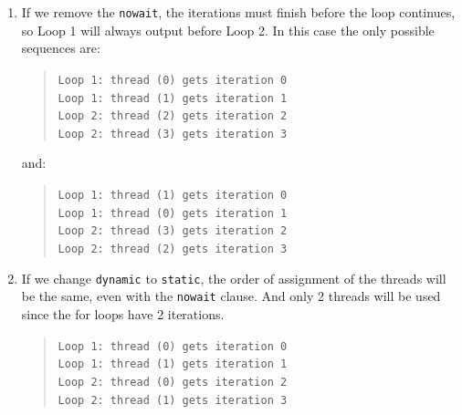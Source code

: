 \begin{enumerate}[label=\Alph*)]
\begin{enumerate}[label=\arabic*.]
\begin{quote}
{            Loop 1: thread (1) gets iteration 1 \\
            Loop 2: thread (3) gets iteration 2 \\
            Loop 2: thread (2) gets iteration 3}
        \end{quote}
        and:
        \begin{quote}
            \texttt{Loop 1: thread (0) gets iteration 0 \\
            Loop 1: thread (3) gets iteration 1 \\
            Loop 2: thread (1) gets iteration 2 \\
            Loop 2: thread (2) gets iteration 3}
        \end{quote}
        \item If we remove the \texttt{nowait}, the iterations must finish before the loop continues, so Loop 1 will always output before Loop 2.
        In this case the only possible sequences are:
        \begin{quote}
            \texttt{Loop 1: thread (0) gets iteration 0 \\
            Loop 1: thread (1) gets iteration 1 \\
            Loop 2: thread (2) gets iteration 2 \\
            Loop 2: thread (3) gets iteration 3}
        \end{quote}
        and:
        \begin{quote}
            \texttt{Loop 1: thread (1) gets iteration 0 \\
            Loop 1: thread (0) gets iteration 1 \\
            Loop 2: thread (3) gets iteration 2 \\
            Loop 2: thread (2) gets iteration 3}
        \end{quote}
        
        \item If we change \texttt{dynamic} to \texttt{static}, the order of assignment of the threads will be the same,
        even with the \texttt{nowait} clause. And only 2 threads will be used since the for loops have 2 iterations.
        \begin{quote}
            \texttt{Loop 1: thread (0) gets iteration 0 \\
            Loop 1: thread (1) gets iteration 1 \\
            Loop 2: thread (0) gets iteration 2 \\
            Loop 2: thread (1) gets iteration 3}
        \end{quote}
        

\end{enumerate}
\end{enumerate}
